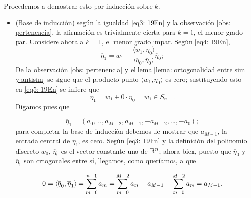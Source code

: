 Procedemos a demostrar esto por inducción sobre $k$.

\begin{itemize}

\item (Base de inducción) según la igualdad
\eqref{eq3: 19En} y la observación 
\ref{obs: pertenencia}, la afirmación 
es trivialmente cierta para $k=0$, el menor grado par.
Considere ahora a $k=1$, el menor grado impar. Según 
\eqref{eq4: 19En}, 
\begin{equation}
\label{eq5: 19En}
\overline{\eta}_{1}= w_{1}
- \frac{\langle w_{1}, \overline{\eta}_{0} \rangle}
{\langle \overline{\eta}_{0}, \overline{\eta}_{0} \rangle}\overline{\eta}_{0};
\end{equation}
De la observación 
\ref{obs: pertenencia} y el lema
\ref{lema: ortogonalidad entre sim y antisim} se sigue
que el producto punto $\langle w_{1}, \overline{\eta}_{0} \rangle$
es cero; sustituyendo esto en \eqref{eq5: 19En}
se infiere que 
\[
\overline{\eta}_{1} = w_{1} + 0 \cdot \overline{\eta}_{0}=
w_{1} \in S_{n,-}.
\]
Digamos pues que

\[
\overline{\eta}_{1} = 
(a_{0}, \ldots , a_{M-2}, a_{M-1}, -a_{M-2}, \ldots , -a_{0} );
\]
para completar la base de inducción debemos de mostrar
que $a_{M-1}$, la entrada central de $\overline{\eta}_{1}$,
es cero. Según \eqref{eq3: 19En} y
la definición del polinomio discreto $w_{0}$, 
$\overline{\eta}_{0}$ es el vector constante uno de $\mathbb{R}^{n}$;
ahora bien, puesto que $\overline{\eta}_{0}$
y $\overline{\eta}_{1}$
son ortogonales entre sí, llegamos, como queríamos, a que

\[
0 = \langle \overline{\eta}_{0}, \overline{\eta}_{1}\rangle
= \sum\limits_{m=0}^{n-1}a_{m} = 
\sum\limits_{m=0}^{M-2}a_{m} + a_{M-1} -
\sum\limits_{m=0}^{M-2}a_{m} = a_{M-1}.
\]




\end{itemize}
